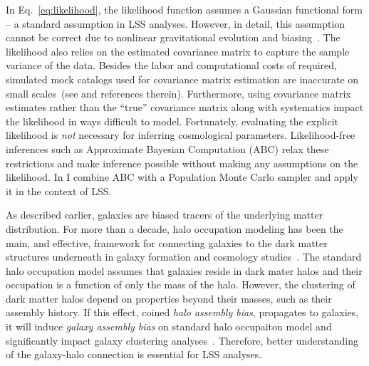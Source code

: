 In Eq.~\ref{eq:likelihood}, the likelihood function assumes a Gaussian functional form
-- a standard assumption in LSS analyses. However, in detail, this assumption cannot 
be correct due to nonlinear gravitational evolution and biasing~\citep{Mo:1996aa, Sommerville:2001aa, Casas-Miranda:2002aa, Bernardeau:2002aa}.
The likelihood also relies on the estimated covariance matrix to capture 
the sample variance of the data. Besides the labor and computational costs 
of required,  simulated mock catalogs used for covariance matrix estimation 
are inaccurate on small scales~(see \citealt{cosmiccode,nifty} and references therein). 
Furthermore, using covariance 
matrix estimates rather than the ``true'' covariance matrix \citep{Sellentin:2016a}
along with systematics impact the likelihood in ways difficult to model. 
Fortunately, evaluating the explicit likelihood is {\em not} necessary for inferring
cosmological parameters. Likelihood-free inferences such as Approximate 
Bayesian Computation (ABC) relax these restrictions and make inference 
possible without making any assumptions on the likelihood.  In 
I combine ABC with a Population Monte Carlo sampler and apply it in the
context of LSS.

As described earlier, galaxies are biased tracers of the 
underlying matter distribution. For more than a decade, halo occupation 
modeling has been the main, and effective, framework for connecting galaxies
to the dark matter structures underneath in galaxy formation and cosmology
studies~\citep{Yang:2003aa, Tinker:2005aa, vandenBosch:2007aa, Zheng:2007aa, 
Conroy:2009aa, Guo:2011aa, Leauthaud:2012aa, Tinker:2013aa, Zu:2015aa}.
The standard halo occupation model
assumes that galaxies reside in dark mater halos and their occupation 
is a function of only the mass of the halo. However, the clustering of dark 
matter halos depend on properties beyond their masses, such as their 
assembly history. If this effect, coined 
{\em halo assembly bias}, propagates to galaxies, it will induce 
{\em galaxy assembly bias} on standard halo occupaiton model and 
significantly impact galaxy clustering 
analyses~\citep[][]{hearin15, Zentner:2016aa, Vakili:2016aa}. 
Therefore, better understanding of the galaxy-halo connection is 
essential for LSS analyses. 

